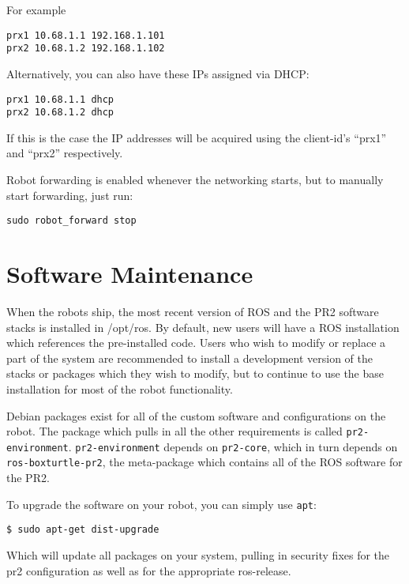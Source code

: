 For example

\begin{verbatim}
prx1 10.68.1.1 192.168.1.101
prx2 10.68.1.2 192.168.1.102
\end{verbatim}

Alternatively, you can also have these IPs assigned via DHCP:

\begin{verbatim}
prx1 10.68.1.1 dhcp
prx2 10.68.1.2 dhcp
\end{verbatim}

If this is the case the IP addresses will be acquired using the
client-id's ``prx1'' and ``prx2'' respectively.

Robot forwarding is enabled whenever the networking starts, but to
manually start forwarding, just run:

\begin{verbatim}
sudo robot_forward stop
\end{verbatim}

\section{Software Maintenance}

When the robots ship, the most recent version of ROS and the PR2
software stacks is installed in /opt/ros.  By default, new users will
have a ROS installation which references the pre-installed code.
Users who wish to modify or replace a part of the system are
recommended to install a development version of the stacks or packages
which they wish to modify, but to continue to use the base
installation for most of the robot functionality.

Debian packages exist for all of the custom software and
configurations on the robot.  The package which pulls in all the other
requirements is called \texttt{pr2-environment}.
\texttt{pr2-environment} depends on \texttt{pr2-core}, which in turn
depends on \texttt{ros-boxturtle-pr2}, the meta-package which contains
all of the ROS software for the PR2.

To upgrade the software on your robot, you can simply use \texttt{apt}:

\begin{verbatim}
$ sudo apt-get dist-upgrade
\end{verbatim}

Which will update all packages on your system, pulling in security fixes for
the pr2 configuration as well as for the appropriate ros-release.


